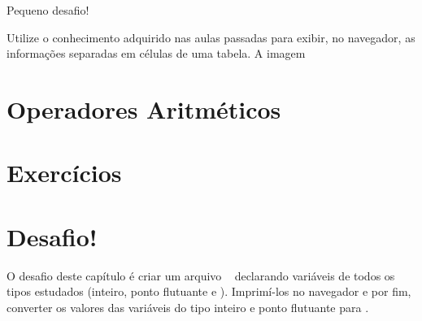 {\Large Pequeno desafio!}

Utilize o conhecimento adquirido nas aulas passadas para exibir, no navegador, as informações
separadas em células de uma tabela. A imagem 


\section{Operadores Aritméticos}
\label{operadores-artimeticos}


\section{Exercícios}
\label{cap4-exercicios}


\section{Desafio!}
\label{cap4-desafio}
O desafio deste capítulo é criar um arquivo \phpextensao~ declarando variáveis de todos os tipos
estudados (inteiro, ponto flutuante e \tipostring). Imprimí-los no navegador e por fim, converter
os valores das variáveis do tipo inteiro e ponto flutuante para \tipostring.
